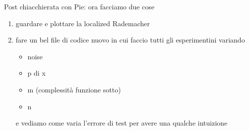 Post chiacchierata con Pie: ora facciamo due cose
\begin{enumerate}
    \item guardare e plottare la localized Rademacher
    \item fare un bel file di codice nuovo in cui faccio tutti gli esperimentini variando 
     \begin{itemize}
        \item noise
        \item p di x
        \item m (complessità funzione sotto)
        \item n
    \end{itemize}
    e vediamo come varia l'errore di test per avere una qualche intuizione
\end{enumerate}


